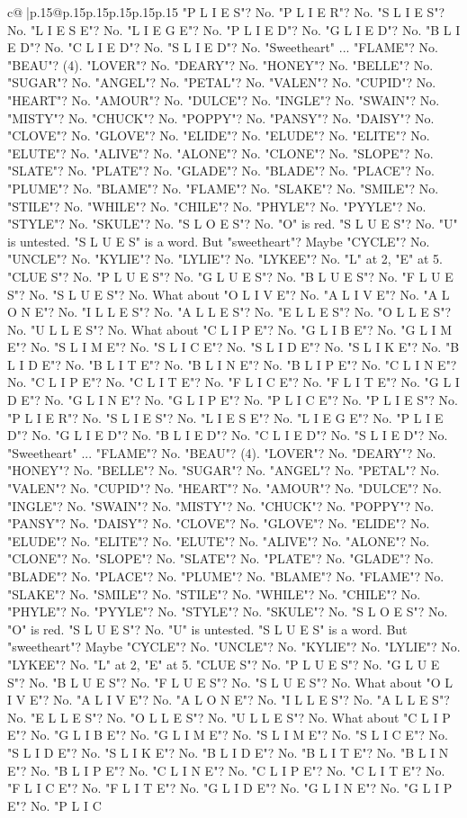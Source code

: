 \documentclass{article}
\begin{document}
{\begin{supertabular}{c@{$\;$}|p{.15\linewidth}@{}p{.15\linewidth}p{.15\linewidth}p{.15\linewidth}p{.15\linewidth}p{.15\linewidth}}
{{{"P L I E S"? No. "P L I E R"? No. "S L I E S"? No. "L I E S E"? No. "L I E G E"? No. "P L I E D"? No. "G L I E D"? No. "B L I E D"? No. "C L I E D"? No. "S L I E D"? No. "Sweetheart" ... "FLAME"? No. "BEAU"? (4). "LOVER"? No. "DEARY"? No. "HONEY"? No. "BELLE"? No. "SUGAR"? No. "ANGEL"? No. "PETAL"? No. "VALEN"? No. "CUPID"? No. "HEART"? No. "AMOUR"? No. "DULCE"? No. "INGLE"? No. "SWAIN"? No. "MISTY"? No. "CHUCK"? No. "POPPY"? No. "PANSY"? No. "DAISY"? No. "CLOVE"? No. "GLOVE"? No. "ELIDE"? No. "ELUDE"? No. "ELITE"? No. "ELUTE"? No. "ALIVE"? No. "ALONE"? No. "CLONE"? No. "SLOPE"? No. "SLATE"? No. "PLATE"? No. "GLADE"? No. "BLADE"? No. "PLACE"? No. "PLUME"? No. "BLAME"? No. "FLAME"? No. "SLAKE"? No. "SMILE"? No. "STILE"? No. "WHILE"? No. "CHILE"? No. "PHYLE"? No. "PYYLE"? No. "STYLE"? No. "SKULE"? No. "S L O E S"? No. "O" is red. "S L U E S"? No. "U" is untested. "S L U E S" is a word. But "sweetheart"? Maybe "CYCLE"? No. "UNCLE"? No. "KYLIE"? No. "LYLIE"? No. "LYKEE"? No. "L" at 2, "E" at 5. "CLUE S"? No. "P L U E S"? No. "G L U E S"? No. "B L U E S"? No. "F L U E S"? No. "S L U E S"? No. What about "O L I V E"? No. "A L I V E"? No. "A L O N E"? No. "I L L E S"? No. "A L L E S"? No. "E L L E S"? No. "O L L E S"? No. "U L L E S"? No. What about "C L I P E"? No. "G L I B E"? No. "G L I M E"? No. "S L I M E"? No. "S L I C E"? No. "S L I D E"? No. "S L I K E"? No. "B L I D E"? No. "B L I T E"? No. "B L I N E"? No. "B L I P E"? No. "C L I N E"? No. "C L I P E"? No. "C L I T E"? No. "F L I C E"? No. "F L I T E"? No. "G L I D E"? No. "G L I N E"? No. "G L I P E"? No. "P L I C E"? No. "P L I E S"? No. "P L I E R"? No. "S L I E S"? No. "L I E S E"? No. "L I E G E"? No. "P L I E D"? No. "G L I E D"? No. "B L I E D"? No. "C L I E D"? No. "S L I E D"? No. "Sweetheart" ... "FLAME"? No. "BEAU"? (4). "LOVER"? No. "DEARY"? No. "HONEY"? No. "BELLE"? No. "SUGAR"? No. "ANGEL"? No. "PETAL"? No. "VALEN"? No. "CUPID"? No. "HEART"? No. "AMOUR"? No. "DULCE"? No. "INGLE"? No. "SWAIN"? No. "MISTY"? No. "CHUCK"? No. "POPPY"? No. "PANSY"? No. "DAISY"? No. "CLOVE"? No. "GLOVE"? No. "ELIDE"? No. "ELUDE"? No. "ELITE"? No. "ELUTE"? No. "ALIVE"? No. "ALONE"? No. "CLONE"? No. "SLOPE"? No. "SLATE"? No. "PLATE"? No. "GLADE"? No. "BLADE"? No. "PLACE"? No. "PLUME"? No. "BLAME"? No. "FLAME"? No. "SLAKE"? No. "SMILE"? No. "STILE"? No. "WHILE"? No. "CHILE"? No. "PHYLE"? No. "PYYLE"? No. "STYLE"? No. "SKULE"? No. "S L O E S"? No. "O" is red. "S L U E S"? No. "U" is untested. "S L U E S" is a word. But "sweetheart"? Maybe "CYCLE"? No. "UNCLE"? No. "KYLIE"? No. "LYLIE"? No. "LYKEE"? No. "L" at 2, "E" at 5. "CLUE S"? No. "P L U E S"? No. "G L U E S"? No. "B L U E S"? No. "F L U E S"? No. "S L U E S"? No. What about "O L I V E"? No. "A L I V E"? No. "A L O N E"? No. "I L L E S"? No. "A L L E S"? No. "E L L E S"? No. "O L L E S"? No. "U L L E S"? No. What about "C L I P E"? No. "G L I B E"? No. "G L I M E"? No. "S L I M E"? No. "S L I C E"? No. "S L I D E"? No. "S L I K E"? No. "B L I D E"? No. "B L I T E"? No. "B L I N E"? No. "B L I P E"? No. "C L I N E"? No. "C L I P E"? No. "C L I T E"? No. "F L I C E"? No. "F L I T E"? No. "G L I D E"? No. "G L I N E"? No. "G L I P E"? No. "P L I C }}}
\end{supertabular}}
\end{document}
